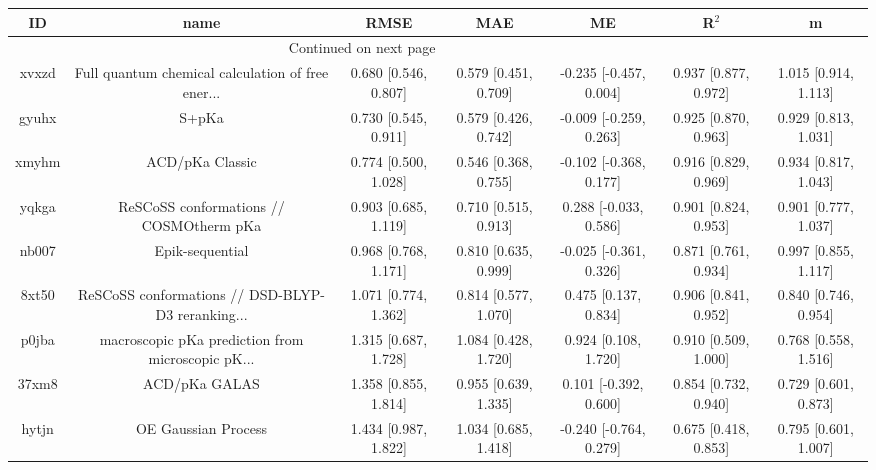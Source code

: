 \documentclass{article}
\begin{document}
\begin{center}
\begin{longtable}{|ccccccc|}
\toprule
    ID &                                               name &                  RMSE &                   MAE &                       ME &                 R$^2$ &                      m \\
\midrule
\endhead
\midrule
\multicolumn{3}{r}{{Continued on next page}} \\
\midrule
\endfoot

\bottomrule
\endlastfoot
 xvxzd &  Full quantum chemical calculation of free ener... &  0.680 [0.546, 0.807] &  0.579 [0.451, 0.709] &   -0.235 [-0.457, 0.004] &  0.937 [0.877, 0.972] &   1.015 [0.914, 1.113] \\
 gyuhx &                                              S+pKa &  0.730 [0.545, 0.911] &  0.579 [0.426, 0.742] &   -0.009 [-0.259, 0.263] &  0.925 [0.870, 0.963] &   0.929 [0.813, 1.031] \\
 xmyhm &                                    ACD/pKa Classic &  0.774 [0.500, 1.028] &  0.546 [0.368, 0.755] &   -0.102 [-0.368, 0.177] &  0.916 [0.829, 0.969] &   0.934 [0.817, 1.043] \\
 yqkga &            ReSCoSS conformations // COSMOtherm pKa &  0.903 [0.685, 1.119] &  0.710 [0.515, 0.913] &    0.288 [-0.033, 0.586] &  0.901 [0.824, 0.953] &   0.901 [0.777, 1.037] \\
 nb007 &                                    Epik-sequential &  0.968 [0.768, 1.171] &  0.810 [0.635, 0.999] &   -0.025 [-0.361, 0.326] &  0.871 [0.761, 0.934] &   0.997 [0.855, 1.117] \\
 8xt50 &  ReSCoSS conformations // DSD-BLYP-D3 reranking... &  1.071 [0.774, 1.362] &  0.814 [0.577, 1.070] &     0.475 [0.137, 0.834] &  0.906 [0.841, 0.952] &   0.840 [0.746, 0.954] \\
 p0jba &  macroscopic pKa prediction from microscopic pK... &  1.315 [0.687, 1.728] &  1.084 [0.428, 1.720] &     0.924 [0.108, 1.720] &  0.910 [0.509, 1.000] &   0.768 [0.558, 1.516] \\
 37xm8 &                                      ACD/pKa GALAS &  1.358 [0.855, 1.814] &  0.955 [0.639, 1.335] &    0.101 [-0.392, 0.600] &  0.854 [0.732, 0.940] &   0.729 [0.601, 0.873] \\
 hytjn &                                OE Gaussian Process &  1.434 [0.987, 1.822] &  1.034 [0.685, 1.418] &   -0.240 [-0.764, 0.279] &  0.675 [0.418, 0.853] &   0.795 [0.601, 1.007] \\

\end{longtable}
\end{center}
\end{document}

